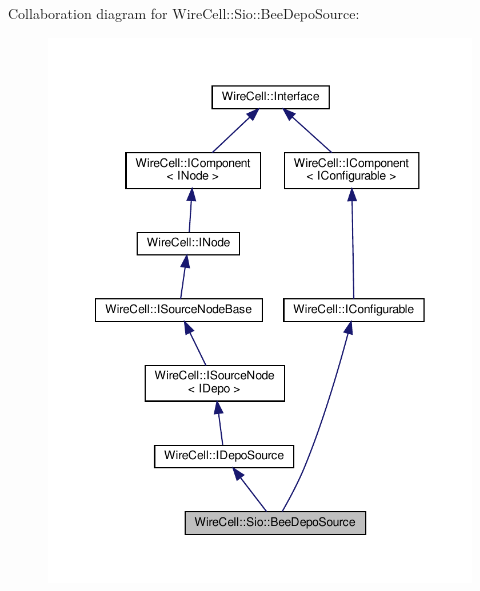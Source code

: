 Collaboration diagram for Wire\+Cell\+:\+:Sio\+:\+:Bee\+Depo\+Source\+:
\nopagebreak
\begin{figure}[H]
\begin{center}
\leavevmode
\includegraphics[width=350pt]{class_wire_cell_1_1_sio_1_1_bee_depo_source__coll__graph}
\end{center}
\end{figure}
